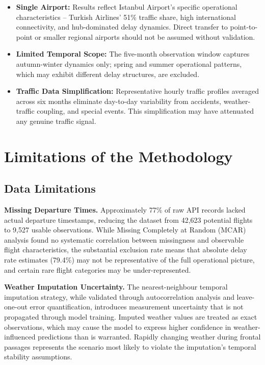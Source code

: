 \documentclass{report}
\begin{document}
\begin{itemize}
  \item \textbf{Single Airport:} Results reflect Istanbul Airport's specific
        operational characteristics -- Turkish Airlines' 51\% traffic share,
        high international connectivity, and hub-dominated delay dynamics.
        Direct transfer to point-to-point or smaller regional airports should
        not be assumed without validation.
  \item \textbf{Limited Temporal Scope:} The five-month observation window
        captures autumn-winter dynamics only; spring and summer operational
        patterns, which may exhibit different delay structures, are excluded.
  \item \textbf{Traffic Data Simplification:} Representative hourly traffic
        profiles averaged across six months eliminate day-to-day variability
        from accidents, weather-traffic coupling, and special events.  This
        simplification may have attenuated any genuine traffic signal.
\end{itemize}


\section{Limitations of the Methodology}
\label{sec:method_limitations}

\subsection{Data Limitations}

\textbf{Missing Departure Times.}  Approximately 77\% of raw API records
lacked actual departure timestamps, reducing the dataset from 42,623
potential flights to 9,527 usable observations.  While Missing Completely at
Random (MCAR) analysis found no systematic correlation between missingness
and observable flight characteristics, the substantial exclusion rate means
that absolute delay rate estimates (79.4\%) may not be representative of the
full operational picture, and certain rare flight categories may be
under-represented.

\textbf{Weather Imputation Uncertainty.}  The nearest-neighbour temporal
imputation strategy, while validated through autocorrelation analysis and
leave-one-out error quantification, introduces measurement uncertainty that
is not propagated through model training.  Imputed weather values are treated
as exact observations, which may cause the model to express higher confidence
in weather-influenced predictions than is warranted.  Rapidly changing weather
during frontal passages represents the scenario most likely to violate the
imputation's temporal stability assumptions.
\end{document}
